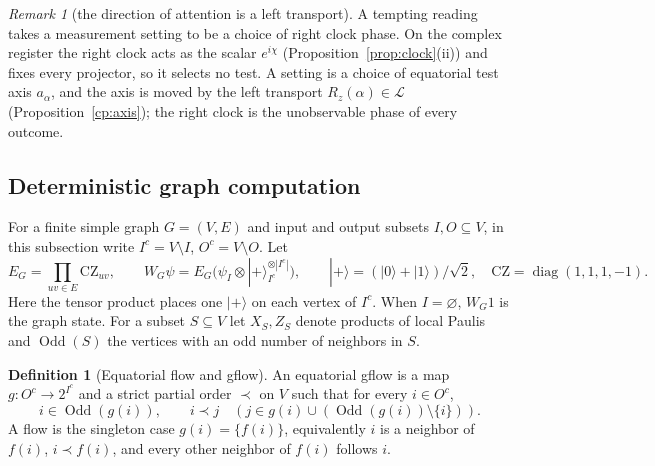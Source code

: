 \documentclass[aps,pra,onecolumn,superscriptaddress,nofootinbib,10pt]{revtex4-2}
\theoremstyle{definition}
\newtheorem{definition}[theorem]{Definition}
\theoremstyle{remark}
\newtheorem{remark}[theorem]{Remark}
\newcommand{\cL}{\mathcal{L}}
\begin{document}
\begin{remark}[the direction of attention is a left transport]\label{rem:cpattention}
A tempting reading takes a measurement setting to be a choice of right clock phase.  On the complex
register the right clock acts as the scalar $e^{i\chi}$ (Proposition~\ref{prop:clock}(ii)) and fixes every projector, so it selects no
test.  A setting is a choice of equatorial test axis $a_\alpha$, and the axis is moved by the left transport $R_z(\alpha)\in\cL$
(Proposition~\ref{cp:axis}); the right clock is the unobservable phase of every outcome.
\end{remark}

\subsection{Deterministic graph computation}

For a finite simple graph $G=(V,E)$ and input and output subsets $I,O\subseteq V$, in this subsection write $I^c=V\setminus I$, $O^c=V\setminus O$. Let
\[
 E_G=\prod_{uv\in E}\mathrm{CZ}_{uv},\qquad
 W_G\psi=E_G(\psi_I\otimes |+\rangle_{I^c}^{\otimes |I^c|}),\qquad
 |+\rangle=(|0\rangle+|1\rangle)/\sqrt2,\quad
 \mathrm{CZ}=\operatorname{diag}(1,1,1,-1).
\]
Here the tensor product places one $|+\rangle$ on each vertex of $I^c$. When $I=\varnothing$, $W_G1$ is the graph state. For a subset $S\subseteq V$ let $X_S,Z_S$ denote products of local Paulis and $\operatorname{Odd}(S)$ the vertices with an odd number of neighbors in $S$.

\begin{definition}[Equatorial flow and gflow]\label{cp:gflow}
An equatorial gflow is a map $g:O^c\to 2^{I^c}$ and a strict partial order $\prec$ on $V$ such that for every $i\in O^c$,
\[
 i\in\operatorname{Odd}(g(i)),\qquad
 i\prec j\quad(j\in g(i)\cup(\operatorname{Odd}(g(i))\setminus\{i\})).
\]
A flow is the singleton case $g(i)=\{f(i)\}$, equivalently $i$ is a neighbor of $f(i)$, $i\prec f(i)$, and every other neighbor of $f(i)$ follows $i$.
\end{definition}
\end{document}
